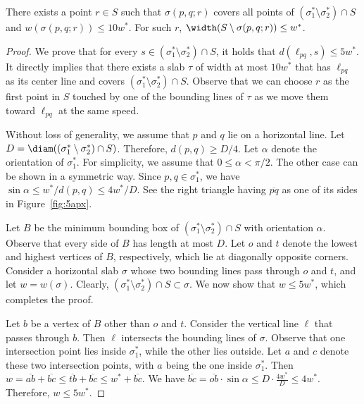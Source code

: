 \begin{lemma}
    There exists a point $r\in S$ such that $\sigma(p, q;r)$ covers all points of $(\sigma_1^*\setminus \sigma_2^* ) \cap S $ and $w(\sigma(p, q;r)) \le 10 w^*$. 
    For such $r$, $\width(S \setminus \sigma(p, q; r))\le w^*$.
    \label{lem:10apx_existence}
\end{lemma}


\begin{proof}
    We prove that for every $s\in (\sigma_1^* \setminus \sigma_2^*)\cap S$, it holds that $d(\ell_{pq}, s) \le 5w^*$. It directly implies that there exists a slab $\tau$ of width at most $10w^*$ that has $\ell_{pq}$ as its center line and covers $(\sigma_1^*\setminus \sigma_2^* ) \cap S$. 
    Observe that we can choose $r$ as the first point in $S$ touched by one of the bounding lines of $\tau$ as we move them toward $\ell_{pq}$ at the same speed.

    Without loss of generality, we assume that $p$ and $q$ lie on a horizontal line. 
    Let $D = \diam((\sigma_1^* \setminus \sigma_2^*) \cap S)$. 
    Therefore, $d(p, q) \ge D/4$. 
    Let $\alpha$ denote the orientation of $\sigma_1^*$. 
    For simplicity, we assume that $0\le \alpha < \pi/2$. The other case can be shown in a symmetric way. 
    Since $p, q \in \sigma_1^*$, we have $\sin \alpha \le w^*/ d(p, q) \le  4w^*/D$. See the right triangle having $\overline{pq}$ as one of its sides in Figure~\ref{fig:5apx}.
    
    Let $B$ be the minimum bounding box of $(\sigma_1^* \setminus \sigma_2^*) \cap S$ with orientation $\alpha$.
    Observe that every side of $B$ has length at most $D$. 
    Let $o$ and $t$ denote the lowest and highest vertices of $B$, respectively, which lie at diagonally opposite corners.
    Consider a horizontal slab $\sigma$ whose two bounding lines pass through $o$ and $t$, and let $w = w(\sigma)$.  
    Clearly, $(\sigma_1^* \setminus \sigma_2^*) \cap S \subset \sigma$. 
    We now show that $w \le 5w^*$, which completes the proof.

    Let $b$ be a vertex of $B$ other than $o$ and $t$. 
    Consider the vertical line $\ell$ that passes through $b$. Then $\ell$ intersects the bounding lines of $\sigma$. 
    Observe that one intersection point lies inside $\sigma_1^*$, while the other lies outside. 
    Let $a$ and $c$ denote these two intersection points, with $a$ being the one inside $\sigma_1^*$. 
    Then $w = \overline{ab} + \overline{bc} \le \overline{tb} + \overline{bc} \le w^* + \overline{bc}$.
     We have $\overline{bc} = \overline{ob}\cdot \sin \alpha 
    \le D \cdot \frac{4w^*}{D} \le 4w^*$.
    Therefore, $w \le 5w^*$. 
\end{proof}

